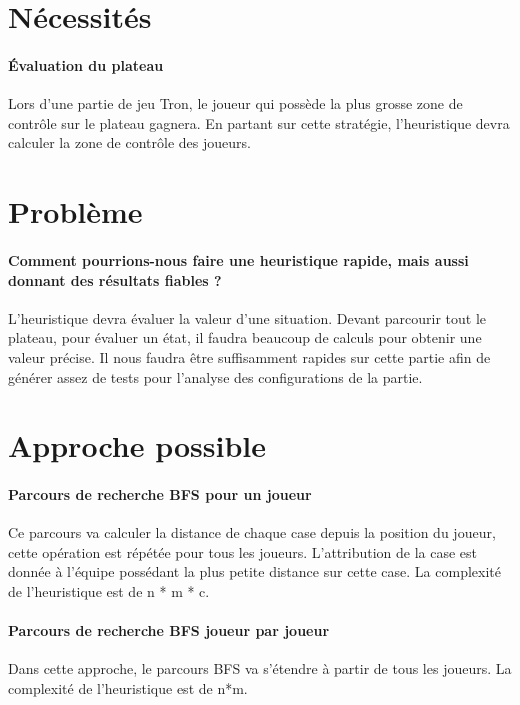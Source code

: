 \section{Nécessités}

\paragraph{Évaluation du plateau}
Lors d'une partie de jeu Tron, le joueur qui possède la plus grosse
zone de contrôle sur le plateau gagnera. En partant sur cette stratégie,
l'heuristique devra calculer la zone de contrôle des joueurs.

\section{Problème}

\paragraph{Comment pourrions-nous faire une heuristique rapide, mais aussi donnant
des résultats fiables ?}
L'heuristique devra évaluer la valeur d'une situation. Devant
parcourir tout le plateau, pour évaluer un état, il faudra beaucoup de 
calculs pour obtenir une valeur précise. Il nous faudra être suffisamment
rapides sur cette partie afin de générer assez de tests pour l'analyse des
configurations de la partie.

\section{Approche possible}

\paragraph{Parcours de recherche BFS pour un joueur}
Ce parcours va calculer la distance de chaque case depuis la
position du joueur, cette opération est répétée pour tous les joueurs.
L'attribution de la case est donnée à l'équipe possédant la plus petite
distance sur cette case. La complexité de l'heuristique est de 
n * m * c.

\paragraph{Parcours de recherche BFS joueur par joueur}
Dans cette approche, le parcours BFS va s'étendre à partir de tous 
les joueurs. La complexité de l'heuristique est de n*m.


